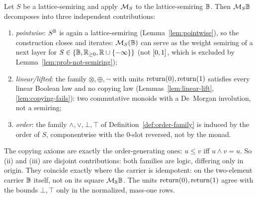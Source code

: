 \begin{theorem}
\label{thm:three-layers}
\leanok
Let $S$ be a lattice-semiring and apply $\mathcal M_{S}$ to the lattice-semiring
$\mathbb B$. Then $\mathcal M_{S}\mathbb B$ decomposes into three independent
contributions:
\begin{enumerate}
\item[(i)] \emph{pointwise}: $S^{\mathbb B}$ is again a lattice-semiring
  (Lemma~\ref{lem:pointwise}), so the construction closes and iterates:
  $\mathcal M_{S}(\mathbb B)$ can serve as the weight semiring of a next layer for
  $S \in \{\mathbb B, \mathbb R_{\ge 0}, \mathbb R \cup \{-\infty\}\}$ (not $[0,1]$, which is excluded by
  Lemma~\ref{lem:prob-not-semiring});
\item[(ii)] \emph{linear/lifted}: the family $\otimes,\oplus,\neg$ with
  units $\mathrm{return}(0),\mathrm{return}(1)$ satisfies every linear Boolean law and no
  copying law (Lemmas~\ref{lem:linear-lift}, \ref{lem:copying-fails}):
  two commutative monoids with a De~Morgan involution, not a semiring;
\item[(iii)] \emph{order}: the family $\wedge,\vee,\bot,\top$ of
  Definition~\ref{def:order-family} is induced by the order of $S$,
  componentwise with the $0$-slot reversed, not by the monad.
\end{enumerate}
The copying axioms are exactly the order-generating ones: $u \le v$
iff $u \wedge v = u$. So (ii) and (iii) are disjoint contributions:
both families are logic, differing only in origin. They coincide
exactly where the carrier is idempotent: on the two-element carrier
$\mathbb B$ itself, not on its square $\mathcal M_{\mathbb B}\mathbb B$. The units
$\mathrm{return}(0),\mathrm{return}(1)$ agree with the bounds $\bot,\top$ only in the
normalized, mass-one rows.
\end{theorem}

